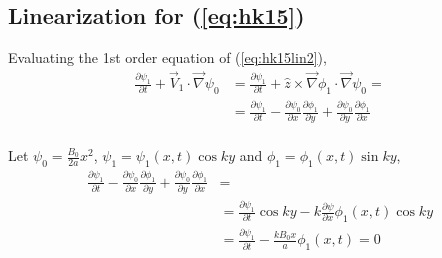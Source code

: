 \documentclass{article}
\begin{document}
\subsection{Linearization for (\ref{eq:hk15})}
Evaluating the 1st order equation of (\ref{eq:hk15lin2}),
\begin{equation}
    \begin{split}
        \frac{\partial \psi_1}{\partial t} + \vec{V}_1 \cdot \vec{\nabla} \psi_0 &= \frac{\partial \psi_1}{\partial t} + \hat{z} \times \vec{\nabla} \phi_1 \cdot \vec{\nabla} \psi_0 = \\
                                                                                 &= \frac{\partial \psi_1}{\partial t} - \frac{\partial \psi_0}{\partial x} \frac{\partial \phi_1}{\partial y} + \frac{\partial \psi_0}{\partial y} \frac{\partial \phi_1}{\partial x} \\ 
    \end{split}
\end{equation} 

Let $\psi_0=\frac{B_0}{2a}x^2$, $\psi_1=\psi_1\left( x,t \right) \cos{ky}$ and $\phi_1=\phi_1\left( x,t \right) \sin{ky}$,
\begin{equation}
   \begin{split}
       \frac{\partial \psi_1}{\partial t} - \frac{\partial \psi_0}{\partial x} \frac{\partial \phi_1}{\partial y} + \frac{\partial \psi_0}{\partial y} \frac{\partial \phi_1}{\partial x} &= \\
                                                                                                                                                                                          &= \frac{\partial \psi_1}{\partial t} \cos{ky} - k\frac{\partial \psi}{\partial x} \phi_1\left( x,t \right) \cos{ky} \\
                                                                                                                                                                                          &= \frac{\partial \psi_1}{\partial t} -\frac{kB_0x}{a}\phi_1\left( x,t \right) = 0
   \end{split} 
\end{equation} 
\end{document}
